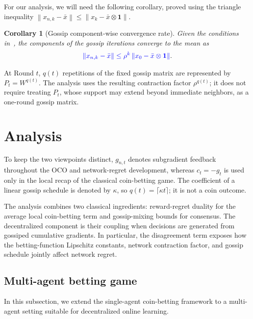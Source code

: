 \documentclass[journal]{IEEEtran}
\newtheorem{corollary}{Corollary}
\newcommand{\norm}[1]{\left\lVert{#1}\right\rVert}
\begin{document}
For our analysis, we will need the following corollary, proved using the triangle inequality $\norm{x_{n,k} - \bar{x}} \leq  \norm{x_{k} - \bar{x} \otimes \mathbf{1}}$.
\begin{corollary}[Gossip component-wise convergence rate]\label{cor:gossip-components}
    Given the conditions in~, the components of the gossip iterations converge to the mean as
    \begin{align}
        {\color{blue}\norm{x_{n,k} - \bar{x}}\leq \rho^k \norm{x_0 - \bar{x}\otimes\mathbf{1}}}.
    \end{align}
\end{corollary}
{\color{blue}
    At Round $t$, $q(t)$ repetitions of the fixed gossip matrix are represented by $P_t=W^{q(t)}$.
    The analysis uses the resulting contraction factor $\rho^{q(t)}$; it does not require treating $P_t$, whose support may extend beyond immediate neighbors, as a one-round gossip matrix.
    \par}

\section{Analysis}\label{sec:analysis}

{\color{blue}
    To keep the two viewpoints distinct, $g_{n,t}$ denotes subgradient feedback throughout the OCO and network-regret development, whereas $c_t=-g_t$ is used only in the local recap of the classical coin-betting game.
    The coefficient of a linear gossip schedule is denoted by $\kappa$, so $q(t)=\lceil\kappa t\rceil$; it is not a coin outcome.

    The analysis combines two classical ingredients: reward-regret duality for the average local coin-betting term and gossip-mixing bounds for consensus.
    The decentralized component is their coupling when decisions are generated from gossiped cumulative gradients.
    In particular, the disagreement term exposes how the betting-function Lipschitz constants, network contraction factor, and gossip schedule jointly affect network regret.
    \par}

\subsection{Multi-agent betting game}

In this subsection, we extend the single-agent coin-betting framework to a multi-agent setting suitable for decentralized online learning.
\end{document}
